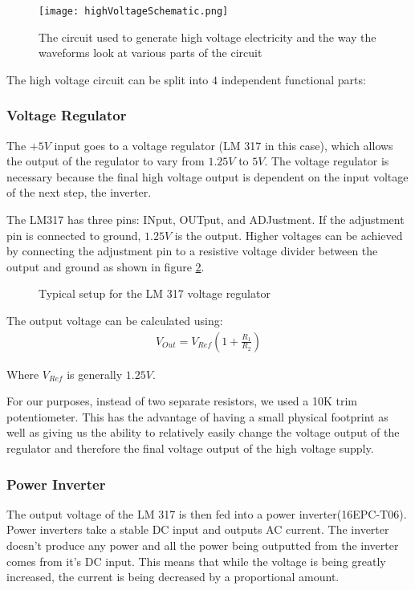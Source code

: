 \documentclass[oneside]{article}
\begin{document}
    \begin{figure}[H]
        \centering
        \texttt{[image: highVoltageSchematic.png]}
        \caption{The circuit used to generate high voltage electricity and the way the waveforms look at various parts of the circuit}
        \label{highVoltageSchematic}
    \end{figure}

    The high voltage circuit can be split into $4$ independent functional parts:
    \subsubsection{Voltage Regulator}
      The $+5V$ input goes to a voltage regulator (LM 317 in this case), which allows the output of the regulator to vary from $1.25V$ to $5V$. The voltage regulator is necessary because the final high voltage output is dependent on the input voltage of the next step, the inverter.

      The LM317 has three pins: INput, OUTput, and ADJustment. If the adjustment pin is connected to ground, $1.25V$ is the output. Higher voltages can be achieved by connecting the adjustment pin to a resistive voltage divider between the output and ground as shown in figure \ref{typicalLM317}.

      \begin{figure}[H]
          \centering
          \def\svgwidth{100mm}
          
          \caption{Typical setup for the LM 317 voltage regulator}
          \label{typicalLM317}
      \end{figure}

      The output voltage can be calculated using:
      \begin{align}
        V_{Out} = V_{Ref}(1 + \frac{R_1}{R_2})
      \end{align}

      \begin{center}
        Where $V_{Ref}$ is generally $1.25V$.
      \end{center}

      For our purposes, instead of two separate resistors, we used a 10K trim potentiometer. This has the advantage of having a small physical footprint as well as giving us the ability to relatively easily change the voltage output of the regulator and therefore the final voltage output of the high voltage supply.

    \subsubsection{Power Inverter}
      The output voltage of the LM 317 is then fed into a power inverter(16EPC-T06). Power inverters take a stable DC input and outputs AC current. The inverter doesn't produce any power and all the power being outputted from the inverter comes from it's DC input. This means that while the voltage is being greatly increased, the current is being decreased by a proportional amount.
\end{document}
